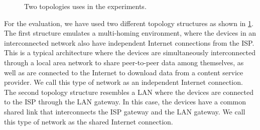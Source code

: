 \begin{figure}[ht]
	\captionsetup[subfigure]{}
	\begin{center}
		\hfill
	\end{center}
	\caption{\label{fig:chap06:topologies} Two topologies uses in the experiments.}
\end{figure}

For the evaluation, we have used two different topology structures as shown in \fig\ref{fig:chap06:topologies}. The first structure emulates a multi-homing environment, where the devices in an interconnected network also have independent Internet connections from the \ac{ISP}. This is a typical architecture where the devices are simultaneously interconnected through a local area network to share peer-to-peer data among themselves, as well as are connected to the Internet to download data from a content service provider. We call this type of network as an independent Internet connection. The second topology structure resembles a \ac{LAN} where the devices are connected to the \ac{ISP} through the \ac{LAN} gateway. In this case, the devices have a common shared link that interconnects the ISP gateway and the LAN gateway. We call this type of network as the shared Internet connection.

